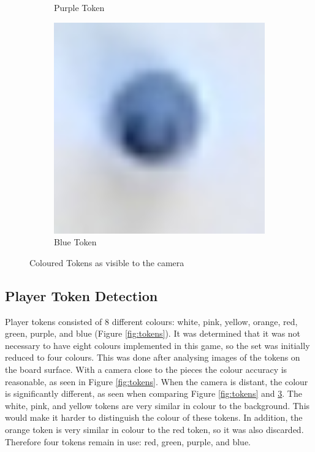 \documentclass[12pt]{article}
\begin{document}
\begin{figure}[H]
\begin{subfigure}{0.2\textwidth}
        \caption{Purple Token}
        \label{fig:tokencolorg}
    \end{subfigure}
    \begin{subfigure}{0.2\textwidth}
        \includegraphics[width=1\textwidth]{images/figures/fig10h}
        \caption{Blue Token}
        \label{fig:tokencolorh}
    \end{subfigure}
    \caption{Coloured Tokens as visible to the camera}
    \label{fig:tokencolor}
\end{figure}

\subsection{Player Token Detection}
Player tokens consisted of 8 different colours: white, pink, yellow, orange, red, green, purple, and blue (Figure \ref{fig:tokens}). 
It was determined that it was not necessary to have eight colours implemented in this game, so the set was initially reduced to four colours.
This was done after analysing images of the tokens on the board surface. 
With a camera close to the pieces the colour accuracy is reasonable, as seen in Figure \ref{fig:tokens}.
When the camera is distant, the colour is significantly different, as seen when comparing Figure \ref{fig:tokens} and \ref{fig:tokencolor}. 
The white, pink, and yellow tokens are very similar in colour to the background. 
This would make it harder to distinguish the colour of these tokens. 
In addition, the orange token is very similar in colour to the red token, so it was also discarded. 
Therefore four tokens remain in use: red, green, purple, and blue. 
 
\end{document}
